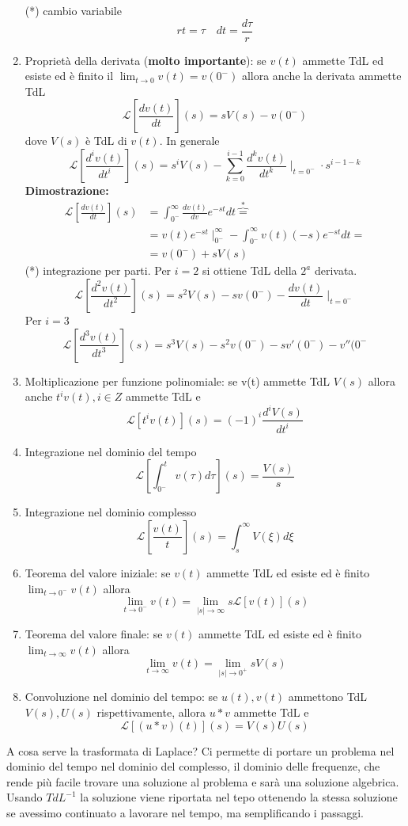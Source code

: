 \documentclass[a4paper, 12pt]{book}
\theoremstyle{plain}
\begin{document}
\begin{enumerate}
\[    \]
    (*) cambio variabile \[ rt = \tau \quad dt = \frac{d\tau}{r}\]
    \item Proprietà della derivata (\textbf{molto importante}): 
    se $v(t)$ ammette TdL ed esiste ed è finito il 
    $\lim_{t \rightarrow 0} v(t) = v(0^-)$ allora anche 
    la derivata ammette TdL \[ \mathcal{L}[\frac{dv(t)}{dt}]
    (s) = sV(s) - v(0^-) \] dove $V(s)$ è TdL di $v(t)$.
    In generale \[ \mathcal{L}[\frac{d^iv(t)}{dt^i}](s)
    = s^i V(s) - \sum_{k=0}^{i-1} \frac{d^kv(t)}{dt^k} \mid_{t = 0^-} \cdot s^{i - 1 - k} \]
    \textbf{Dimostrazione: }
    \[
        \begin{split}
            \mathcal{L}[\frac{dv(t)}{dt}] (s) &= \int_{0^-}^\infty \frac{dv(t)}{dv} e^{-st} dt \overbrace{=}^* \\
            &= v(t) e^{-st} \mid_{0^-}^\infty - \int_{0^-}^\infty v(t) (-s) e^{-st} dt = \\
            &= v(0^-) + sV(s)
        \end{split}
    \]
    (*) integrazione per parti.
    Per $i = 2$ si ottiene TdL della $2^a$ derivata.
    \[ \mathcal{L}[\frac{d^2v(t)}{dt^2}](s) = s^2V(s) - sv(0^-) - \frac{dv(t)}{dt} \mid_{t = 0^-} \]
    Per $i = 3$
    \[ \mathcal{L} [\frac{d^3v(t)}{dt^3}](s) = s^3V(s) - s^2v(0^-) - sv'(0^-) - v''(0^- \]
    \item Moltiplicazione per funzione polinomiale:  se v(t) ammette 
    TdL $V(s)$ allora anche $t^iv(t), i \in Z$ ammette TdL e
        \[ \mathcal{L}[t^i v(t)](s) = (-1)^i \frac{d^i V(s)}{dt^i} \]
    \item Integrazione nel dominio del tempo \[ \mathcal{L}[\int_{0^-}^t v(\tau) d\tau](s) = \frac{V(s)}{s} \]
    \item Integrazione nel dominio complesso \[ \mathcal{L}[\frac{v(t)}{t}](s) = \int_s^\infty V(\xi) d\xi \]
    \item Teorema del valore iniziale: se $v(t)$ ammette TdL
    ed esiste ed è finito $\lim_{t \rightarrow 0^-} v(t)$ allora \[ \lim_{t \rightarrow 0^-} v(t) = \lim_{|s| \rightarrow \infty} s \mathcal{L}[v(t)](s) \]
    \item Teorema del valore finale: se $v(t)$ ammette TdL ed esiste ed è finito $\lim_{t \rightarrow \infty} v(t)$ allora \[ \lim_{t \rightarrow \infty} v(t) = \lim_{|s| \rightarrow 0^+} sV(s) \]
    \item Convoluzione nel dominio del tempo: se $u(t), v(t)$ ammettono TdL $V(s), U(s)$ rispettivamente, allora $u \ast v$ ammette TdL e \[ \mathcal{L}[(u \ast v)(t)](s) = V(s) U(s) \] 
\end{enumerate}
A cosa serve la trasformata di Laplace? Ci permette di 
portare un problema nel dominio del tempo nel dominio del
complesso, il dominio delle frequenze, che rende più facile 
trovare una soluzione al problema e sarà una soluzione 
algebrica. Usando $TdL^{-1}$ la soluzione viene riportata 
nel tepo ottenendo la stessa soluzione se avessimo continuato 
a lavorare nel tempo, ma semplificando i passaggi.
\end{document}
